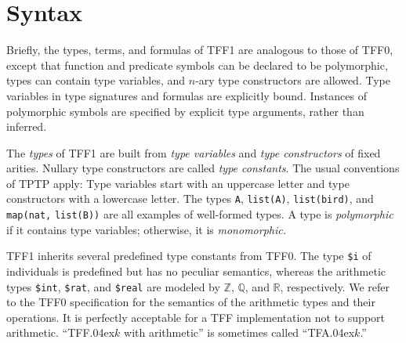 
\section{Syntax} \label{sec_syntax}

Briefly, the types, terms, and formulas of TFF1 are analogous to those of TFF0,
except that function and predicate symbols can be declared to be polymorphic,
types can contain type variables, and $n$-ary type constructors are allowed.
Type variables in type signatures and formulas are explicitly bound. Instances of
polymorphic symbols are specified by explicit type arguments, rather than
inferred.

 The {\em types\/} of TFF1 are built from {\em type
variables\/} and {\em type constructors\/} of fixed arities. Nullary type
constructors are called {\em type constants}. The usual conventions of TPTP
apply: Type variables start with an uppercase letter and type constructors
with a lowercase letter. The types \verb+A+, \verb+list(A)+, \verb+list(bird)+,
and \verb+map(nat,+ \verb+list(B))+ are all examples of well-formed types. A
type is {\em polymorphic} if it contains type variables; otherwise, it is {\em
monomorphic.}


TFF1 inherits several predefined type constants from TFF0.
The type {\tt \$i} %
of individuals is predefined but has no peculiar semantics, whereas the
arithmetic types
{\tt \$int}, {\tt \$rat}, and {\tt \$real} are modeled by $\mathbb{Z}$,
$\mathbb{Q}$, and $\mathbb{R}$, respectively. We refer
to the TFF0 specification \cite{sutcliffe-et-al-2011-tff0} for the semantics of
the arithmetic types and their operations. It is perfectly acceptable for a TFF
implementation not to support arithmetic. ``TFF\kern.04ex$k$ with arithmetic'' is
sometimes called ``TFA\kern.04ex$k$.''

